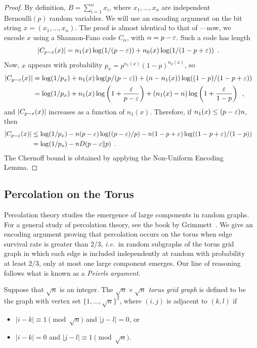 \documentclass{patmorin}
\begin{document}
\begin{proof}
  By definition, $B=\sum_{i=1}^n x_i$, where $x_1,\ldots,x_n$ are
  independent $\mathrm{Bernoulli}(p)$ random variables.  We will use
  an encoding argument on the bit string $x=(x_1,\ldots,x_n)$. The
  proof is almost identical to that of ---now,
  we encode $x$ using a Shannon-Fano code $C_\alpha$, with
  $\alpha = p - \varepsilon$. Such a code has length
  \[
    |C_{p - \varepsilon}(x)| = n_1(x) \log (1/(p - \varepsilon)) + n_0(x) \log (1/(1
    - p + \varepsilon)) \enspace .
  \]
  Now, $x$ appears with probability
  $p_x = p^{n_1(x)} (1 - p)^{n_0(x)}$, so
  \begin{align*}
    |C_{p - \varepsilon}(x)| &= \log(1/p_x) + n_1(x) \log (p/(p - \varepsilon)) + (n - n_1(x)) \log ((1 - p)/(1 - p + \varepsilon)) \\
                      &= \log (1/p_x) + n_1(x) \log \left(1 + \frac{\varepsilon}{p - \varepsilon}\right) + (n_1(x) - n) \log \left(1 + \frac{\varepsilon}{1 - p}\right) \enspace ,
  \end{align*}
  and $|C_{p - \varepsilon}(x)|$ increases as a function of
  $n_1(x)$. Therefore, if $n_1(x) \le (p - \varepsilon)n$, then
  \begin{align*}
    |C_{p - \varepsilon}(x)| &\le \log (1/p_x) - n (p - \varepsilon) \log ((p - \varepsilon)/p) - n (1 - p + \varepsilon) \log ((1 - p + \varepsilon)/(1 - p)) \\
                      &= \log (1/p_x) - n D(p - \varepsilon \| p) \enspace .
  \end{align*}
  The Chernoff bound is obtained by applying the Non-Uniform Encoding
  Lemma.
\end{proof}

\subsection{Percolation on the Torus}

Percolation theory studies the emergence of large components in random
graphs. For a general study of percolation theory, see the book by
Grimmett~\cite{grimmett:percolation}.  We give an encoding argument
proving that percolation occurs on the torus when edge survival rate
is greater than $2/3$, \emph{i.e.}~in random subgraphs of the torus
grid graph in which each edge is included independently at random with
probability at least $2/3$, only at most one large component
emerges. Our line of reasoning follows what is known as a
\emph{Peierls argument}.

Suppose that $\sqrt{n}$ is an integer. The \emph{$\sqrt{n} \times \sqrt{n}$
  torus grid graph} is defined to be the graph with vertex set
$\{1, \ldots, \sqrt{n}\}^2$, where $(i, j)$ is adjacent to $(k, l)$
if
\begin{itemize}[topsep=0pt]
\item $|i - k| \equiv 1 \pmod{\sqrt{n}}$ and $|j - l| = 0$, or
\item $|i - k| = 0$ and $|j - l| \equiv 1 \pmod{\sqrt{n}}$.
\end{itemize}
\end{document}
